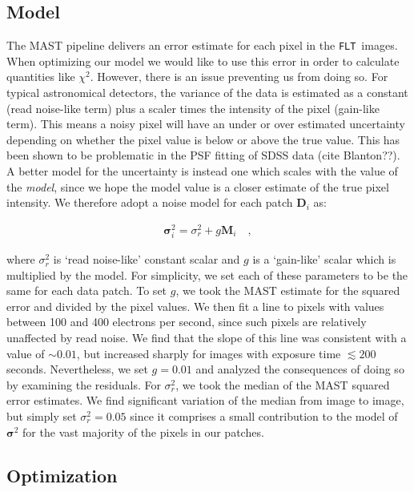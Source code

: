 \documentclass[12pt,letterpaper,preprint]{aastex}
\newcommand{\vect}[1]{\mathbf{#1}}
\newcommand{\FLT}{\texttt{FLT}}
\newcommand{\data}{\vect{D}}
\newcommand{\model}{\vect{M}}
\newcommand{\var}{\vect{\sigma}^2}
\begin{document}
\subsection{Model}

The MAST pipeline delivers an error estimate for each pixel in the \FLT\ images.   When optimizing 
our model we would like to use this error in order to calculate quantities like $\chi^2$.  However, 
there is an issue preventing us from doing so.  For typical astronomical detectors, the variance of 
the data is estimated as a constant (read noise-like term) plus a scaler times the intensity of the pixel 
(gain-like term).  This means a noisy pixel will have an under or over estimated uncertainty depending 
on whether the pixel value is below or above the true value.  This has been shown to be 
problematic in the PSF fitting of SDSS data (cite Blanton??).  A better model for the uncertainty is 
instead one which scales with the value of the \emph{model}, since we hope the model value is a 
closer estimate of the true pixel intensity.  We therefore adopt a noise model for each patch $\data_i$
as:

\begin{eqnarray}
\var_i =  \sigma_{r}^2 + g \model_i
\quad , 
\label{eqn:model-noflat}
\end{eqnarray}

\noindent where $\sigma_{r}^2$ is `read noise-like' constant scalar and $g$ is a `gain-like' scalar 
which is multiplied by the model.  For simplicity, we set each of these parameters to be the same 
for each data patch.  To set $g$, we took the MAST estimate for the squared error and 
divided by the pixel values.  We then fit a line to pixels with values between 100 and 
400 electrons per second, since such pixels are relatively unaffected by read noise.  We find that 
the slope of this line was consistent with a value of 
$\sim0.01$, but increased sharply for images with exposure time $\lesssim 200$ seconds.  
Nevertheless, we set $g=0.01$ and analyzed the consequences of doing so by examining the 
residuals.  For $\sigma_{r}^2$, we took the median of the MAST squared error estimates.  We find 
significant variation of the median from image to image, but simply set $\sigma_{r}^2=0.05$ since 
it comprises a small contribution to the model of $\var$ for the vast majority of the pixels in our 
patches.

\subsection{Optimization}
\end{document}
